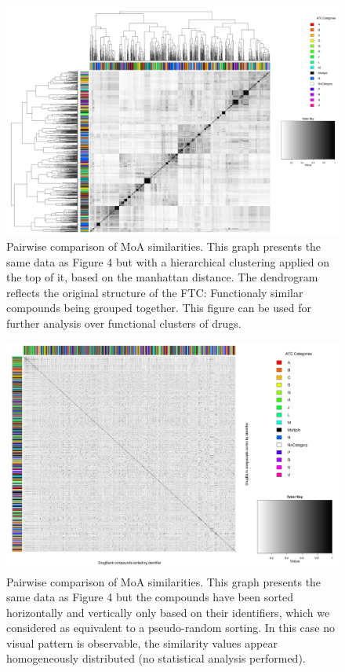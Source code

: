 \documentclass{bioinfo}
\begin{document}
\begin{figure}[!tpb]%
\centerline{\includegraphics{figS4.png}}
\caption{Pairwise comparison of MoA similarities. This graph presents the same 
data as Figure 4 but with a hierarchical clustering applied on the top of it, based on the manhattan distance.
The dendrogram reflects the original structure of the FTC: Functionaly similar compounds being grouped together.
This figure can be used for further analysis over functional clusters of drugs.}\label{fig:S04}
\end{figure}

\begin{figure}[!tpb]%
\centerline{\includegraphics{figS5.png}}
\caption{Pairwise comparison of MoA similarities. This graph presents the same 
data as Figure 4 but the compounds have been sorted horizontally and vertically only based on their identifiers, which
we considered as equivalent to a pseudo-random sorting. In this case
no visual pattern is observable, the similarity values appear homogeneously distributed (no statistical analysis performed).}\label{fig:S05}
\end{figure}










\end{document}
